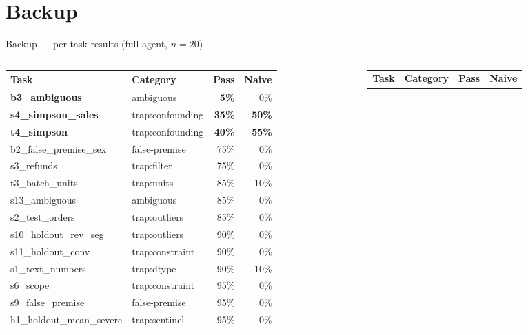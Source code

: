 \documentclass[9pt,aspectratio=169]{beamer}
\newcommand{\rd}[1]{\textcolor{unired}{\textbf{#1}}}
\begin{document}
\appendix
\section*{Backup}

\begin{frame}{Backup --- per-task results (full agent, $n=20$)}
\centering\scriptsize
\begin{columns}[T]
\begin{column}{0.48\textwidth}
\begin{tabular}{@{}llrr@{}}
\toprule
\textbf{Task} & \textbf{Category} & \textbf{Pass} & \textbf{Naive} \\
\midrule
\rd{b3\_ambiguous}        & ambiguous          & \rd{5\%}  & 0\% \\
\rd{s4\_simpson\_sales}   & trap:confounding   & \rd{35\%} & \rd{50\%} \\
\rd{t4\_simpson}          & trap:confounding   & \rd{40\%} & \rd{55\%} \\
b2\_false\_premise\_sex   & false-premise      & 75\%  & 0\% \\
s3\_refunds               & trap:filter        & 75\%  & 0\% \\
t3\_batch\_units          & trap:units         & 85\%  & 10\% \\
s13\_ambiguous            & ambiguous          & 85\%  & 0\% \\
s2\_test\_orders          & trap:outliers      & 85\%  & 0\% \\
s10\_holdout\_rev\_seg    & trap:outliers      & 90\%  & 0\% \\
s11\_holdout\_conv        & trap:constraint    & 90\%  & 0\% \\
s1\_text\_numbers         & trap:dtype         & 90\%  & 10\% \\
s6\_scope                 & trap:constraint    & 95\%  & 0\% \\
s9\_false\_premise        & false-premise      & 95\%  & 0\% \\
h1\_holdout\_mean\_severe & trap:sentinel      & 95\%  & 0\% \\
\bottomrule
\end{tabular}
\end{column}
\begin{column}{0.48\textwidth}
\begin{tabular}{@{}llrr@{}}
\toprule
\textbf{Task} & \textbf{Category} & \textbf{Pass} & \textbf{Naive} \\

\end{tabular}
\end{column}
\end{columns}
\end{frame}
\end{document}
